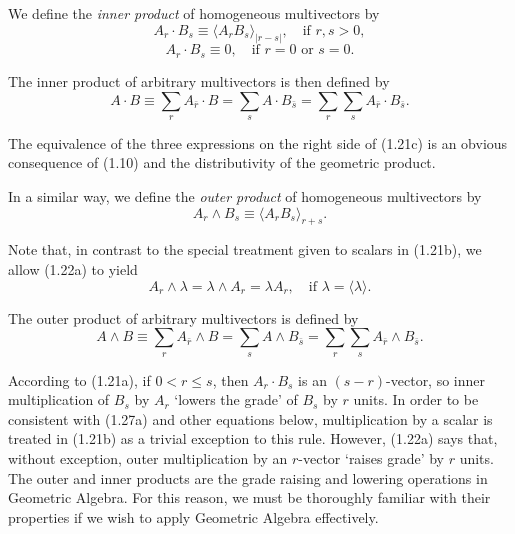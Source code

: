 \documentclass[fleqn]{scrartcl}
\numberwithin{equation}{section}
\begin{document}
\vspace{1em}
\noindent We define the \textit{inner product} of homogeneous multivectors by
\begin{equation}
A_r \cdot B_s \equiv \langle A_r B_s \rangle_{|r-s|}, \quad \text{if } r, s > 0, \tag{1.21a}
\end{equation}
\begin{equation}
A_r \cdot B_s \equiv 0, \quad \text{if } r = 0 \text{ or } s = 0. \tag{1.21b}
\end{equation}

\noindent The inner product of arbitrary multivectors is then defined by
\begin{equation}
A \cdot B \equiv \sum_r A_{\bar{r}} \cdot B = \sum_s A \cdot B_{\bar{s}} = \sum_r \sum_s A_{\bar{r}} \cdot B_{\bar{s}}. \tag{1.21c}
\end{equation}

\noindent The equivalence of the three expressions on the right side of (1.21c) is an obvious consequence of (1.10) and the distributivity of the geometric product.

\vspace{1em}
\noindent In a similar way, we define the \textit{outer product} of homogeneous multivectors by
\begin{equation}
A_r \wedge B_s \equiv \langle A_r B_s \rangle_{r+s}. \tag{1.22a}
\end{equation}

\noindent Note that, in contrast to the special treatment given to scalars in (1.21b), we allow (1.22a) to yield
\begin{equation}
A_r \wedge \lambda = \lambda \wedge A_r = \lambda A_r, \quad \text{if } \lambda = \langle \lambda \rangle. \tag{1.22b}
\end{equation}

\noindent The outer product of arbitrary multivectors is defined by
\begin{equation}
A \wedge B \equiv \sum_r A_{\bar{r}} \wedge B = \sum_s A \wedge B_{\bar{s}} = \sum_r \sum_s A_{\bar{r}} \wedge B_{\bar{s}}. \tag{1.22c}
\end{equation}

\vspace{1em}
\noindent According to (1.21a), if \(0 < r \leq s\), then \(A_r \cdot B_s\) is an \((s-r)\)-vector, so inner multiplication of \(B_s\) by \(A_r\) `lowers the grade' of \(B_s\) by \(r\) units. In order to be consistent with (1.27a) and other equations below, multiplication by a scalar is treated in (1.21b) as a trivial exception to this rule. However, (1.22a) says that, without exception, outer multiplication by an \(r\)-vector `raises grade' by \(r\) units. The outer and inner products are the grade raising and lowering operations in Geometric Algebra. For this reason, we must be thoroughly familiar with their properties if we wish to apply Geometric Algebra effectively.
\end{document}
